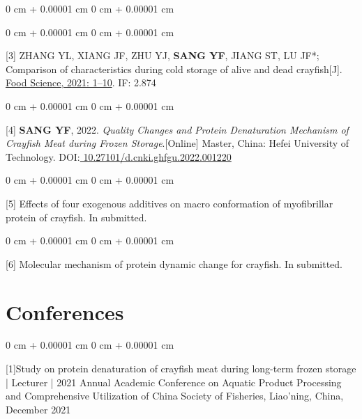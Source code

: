 \documentclass[10pt, letterpaper]{article}
\newenvironment{onecolentry}{
    \begin{adjustwidth}{
        0 cm + 0.00001 cm
    }{
        0 cm + 0.00001 cm
    }
}{
    \end{adjustwidth}
} %
\newenvironment{header}{
    \setlength{\topsep}{0pt}\par\kern\topsep\centering\linespread{1}
}{
    \par\kern\topsep
} %
\begin{document}
\begin{header}
\begin{onecolentry}
    \end{onecolentry}
    
    \begin{onecolentry}
        
[3] ZHANG YL, XIANG JF, ZHU YJ, \textbf{SANG YF}, JIANG ST, LU JF*; Comparison of characteristics during cold storage of alive and dead crayfish[J]. \href{https://www.cnki.net/KCMS/detail/detail.aspx?dbcode=CJFD&dbname=CJFDLAST2022&filename=SPKX202201025&uniplatform=OVERSEA&v=sbig8z5V17yBY-AqcUtSxQFcHpMtT_5pcrf-lFPcgidcdf6c1G7QMfD7iGiFk00C}{Food Science, 2021: 1–10}.  IF: 2.874

    \end{onecolentry}

\begin{onecolentry}
    [4] \textbf{SANG YF}, 2022. \textit{Quality Changes and Protein Denaturation Mechanism of Crayfish Meat during Frozen Storage}.[Online] Master, China: Hefei University of Technology. DOI:\href{https://www.cnki.net/KCMS/detail/detail.aspx?dbcode=CMFD&dbname=CMFD202301&filename=1023419051.nh&uniplatform=OVERSEA&v=jviURrJ1McC-qI-_oaxBTJITqSRSC5onZ8h1phAECx3rV9Jes7ySd36RexrqsF28}{ 10.27101/d.cnki.ghfgu.2022.001220} 

\end{onecolentry}

    \begin{onecolentry}
        
[5] Effects of four exogenous additives on macro conformation of myofibrillar protein of crayfish. In submitted.

    \end{onecolentry}
    
    \begin{onecolentry}
        
[6] Molecular mechanism of protein dynamic change for crayfish. In submitted. 

    \end{onecolentry}



\section{Conferences}

\begin{onecolentry}
    
[1]Study on protein denaturation of crayfish meat during long-term frozen storage | Lecturer | 2021 Annual Academic Conference on Aquatic Product Processing and Comprehensive Utilization of China Society of Fisheries, Liao’ning, China, December 2021 


\end{onecolentry}
\end{header}
\end{document}
